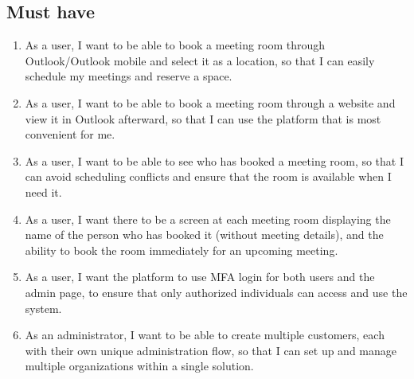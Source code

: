 \subsection*{Must have}
\begin{enumerate}
\item As a user, I want to be able to book a meeting room through Outlook/Outlook mobile and select it as a location, so that I can easily schedule my meetings and reserve a space.
\item As a user, I want to be able to book a meeting room through a website and view it in Outlook afterward, so that I can use the platform that is most convenient for me.
\item As a user, I want to be able to see who has booked a meeting room, so that I can avoid scheduling conflicts and ensure that the room is available when I need it.
\item As a user, I want there to be a screen at each meeting room displaying the name of the person who has booked it (without meeting details), and the ability to book the room immediately for an upcoming meeting.
\item As a user, I want the platform to use MFA login for both users and the admin page, to ensure that only authorized individuals can access and use the system.
\item As an administrator, I want to be able to create multiple customers, each with their own unique administration flow, so that I can set up and manage multiple organizations within a single solution. %
\end{enumerate}


